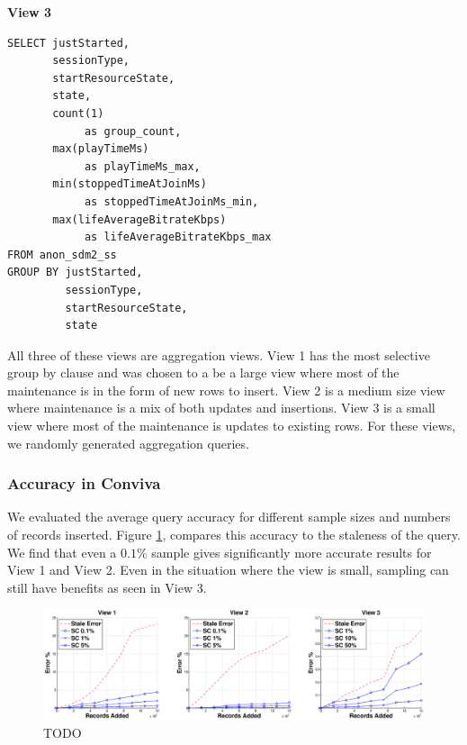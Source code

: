 \textbf{View 3}
\begin{lstlisting}
SELECT justStarted, 
       sessionType, 
       startResourceState, 
       state, 
       count(1) 
            as group_count, 
       max(playTimeMs) 
            as playTimeMs_max, 
       min(stoppedTimeAtJoinMs) 
            as stoppedTimeAtJoinMs_min, 
       max(lifeAverageBitrateKbps) 
            as lifeAverageBitrateKbps_max 
FROM anon_sdm2_ss 
GROUP BY justStarted, 
         sessionType, 
         startResourceState, 
         state
\end{lstlisting}

All three of these views are aggregation views. 
View 1 has the most selective group by clause and was chosen to a be a large view where most of the maintenance is in the form of new rows to insert.
View 2 is a medium size view where maintenance is a mix of both updates and insertions.
View 3 is a small view where most of the maintenance is updates to existing rows.
For these views, we randomly generated aggregation queries.

\subsubsection{Accuracy in Conviva}
We evaluated the average query accuracy for different sample sizes and numbers of records inserted.
Figure \ref{exp5conviva}, compares this accuracy to the staleness of the query.
We find that even a $0.1\%$ sample gives significantly more accurate results for View 1 and View 2.
Even in the situation where the view is small, sampling can still have benefits as seen in View 3.

\begin{figure}[ht!]
\label{exp5conviva}
\centering
\includegraphics[width=\textwidth]{exp/exp5-coniva-accuracy-woutlier.eps}
 \caption{TODO}
\end{figure}

